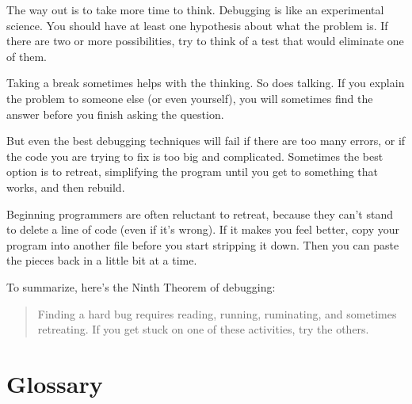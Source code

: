 \documentclass{book}
\begin{document}
The way out is to take more time to think.  Debugging is like an
experimental science.  You should have at least one hypothesis about
what the problem is.  If there are two or more possibilities, try to
think of a test that would eliminate one of them.

Taking a break sometimes helps with the thinking.  So does talking.
If you explain the problem to someone else (or even yourself), you
will sometimes find the answer before you finish asking the question.

But even the best debugging techniques will fail if there are too many
errors, or if the code you are trying to fix is too big and
complicated.  Sometimes the best option is to retreat, simplifying the
program until you get to something that works, and then rebuild.

Beginning programmers are often reluctant to retreat, because
they can't stand to delete a line of code (even if it's wrong).
If it makes you feel better, copy your program into another file
before you start stripping it down.  Then you can paste the pieces
back in a little bit at a time.

To summarize, here's the Ninth Theorem of debugging:

\begin{quote}
Finding a hard bug requires reading, running, ruminating, and
sometimes retreating.  If you get stuck on one of these activities,
try the others.
\end{quote}



\section{Glossary}
\end{document}
